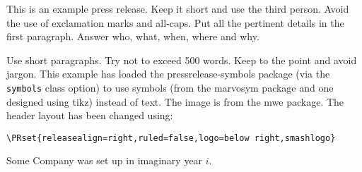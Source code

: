 \documentclass[a4paper,11pt,symbols]{pressrelease}
\date{Some City, \today}
\begin{document}
\begin{pressrelease}

This is an example press release. Keep it short and use the third
person. Avoid the use of exclamation marks and all-caps. Put all the
pertinent details in the first paragraph. Answer who, what, when,
where and why.

Use short paragraphs. Try not to exceed 500 words. Keep to the point
and avoid jargon. This example has loaded the
\textsf{pressrelease-symbols} package (via the \texttt{symbols}
class option) to use symbols (from the
\textsf{marvosym} package and one designed using \textsf{tikz}) instead of text.
The image is from the \textsf{mwe} package. The header layout has
been changed using:
\begin{verbatim}
\PRset{releasealign=right,ruled=false,logo=below right,smashlogo}
\end{verbatim}

\begin{about}
Some Company was set up in imaginary year $i$.
\end{about}

\end{pressrelease}
\end{document}
